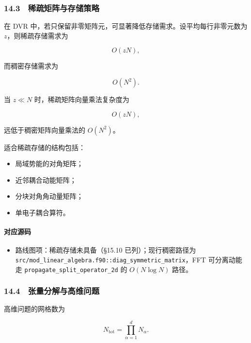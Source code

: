 \documentclass[
]{ctexbook}
\providecommand{\tightlist}{%
  \setlength{\itemsep}{0pt}\setlength{\parskip}{0pt}}
\begin{document}
\hypertarget{ux7a00ux758fux77e9ux9635ux4e0eux5b58ux50a8ux7b56ux7565}{%
\subsubsection{14.3　稀疏矩阵与存储策略}\label{ux7a00ux758fux77e9ux9635ux4e0eux5b58ux50a8ux7b56ux7565}}

在 DVR 中，若只保留非零矩阵元，可显著降低存储需求。设平均每行非零元数为
\(z\)，则稀疏存储需求为

\[
O(zN),
\]

而稠密存储需求为

\[
O(N^2).
\]

当 \(z\ll N\) 时，稀疏矩阵向量乘法复杂度为

\[
O(zN),
\]

远低于稠密矩阵向量乘法的 \(O(N^2)\)。

适合稀疏存储的结构包括：

\begin{itemize}
\tightlist
\item
  局域势能的对角矩阵；
\item
  近邻耦合动能矩阵；
\item
  分块对角角动量矩阵；
\item
  单电子耦合算符。
\end{itemize}

\hypertarget{ux5bf9ux5e94ux6e90ux7801-59}{%
\paragraph{对应源码}\label{ux5bf9ux5e94ux6e90ux7801-59}}

\begin{itemize}
\tightlist
\item
  路线图项：稀疏存储未具备（§15.10 已列）；现行稠密路径为
  \texttt{src/mod\_linear\_algebra.f90::diag\_symmetric\_matrix}，FFT
  可分离动能走 \texttt{propagate\_split\_operator\_2d} 的 \(O(N\log N)\)
  路径。
\end{itemize}

\hypertarget{ux5f20ux91cfux5206ux89e3ux4e0eux9ad8ux7ef4ux95eeux9898}{%
\subsubsection{14.4　张量分解与高维问题}\label{ux5f20ux91cfux5206ux89e3ux4e0eux9ad8ux7ef4ux95eeux9898}}

高维问题的网格数为

\[
N_{\mathrm{tot}}=\prod_{\alpha=1}^{d}N_\alpha.
\]
\end{document}
